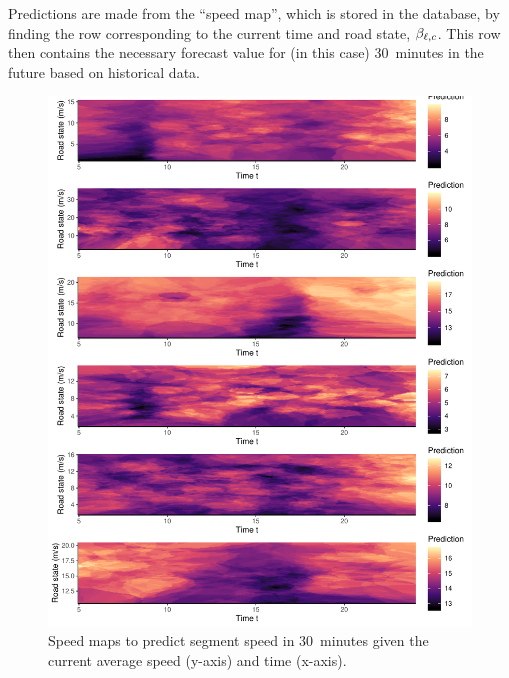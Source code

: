 Predictions are made from the ``speed map'', which is stored in the database, by finding the row corresponding to the current time and road state, $\beta_{\ell,c}$. This row then contains the necessary forecast value for (in this case) 30~minutes in the future based on historical data.







\begin{knitrout}\small
{}\color{fgcolor}\begin{figure}

{\centering \includegraphics[width=\linewidth]{figure/tt_week0_grid-1} 

}

\caption[Speed maps to predict segment speed in 30~minutes given the current state]{Speed maps to predict segment speed in 30~minutes given the current average speed (y-axis) and time (x-axis).}\label{fig:tt_week0_grid}
\end{figure}


\end{knitrout}

